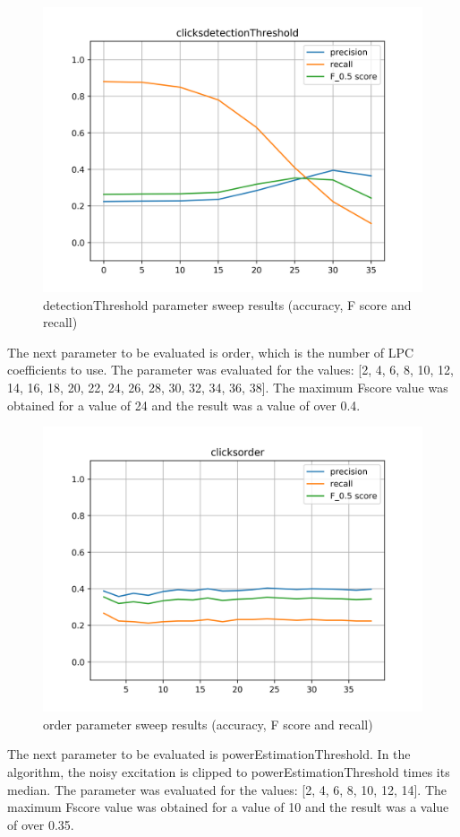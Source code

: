 \begin{figure}[H]
	\includegraphics[clip,width=0.7\columnwidth]{Figures/clicksdetectionThreshold.png}%
	\caption{detectionThreshold parameter sweep results (accuracy, F score and recall)}
	\label{fig:clicksdetectionThreshold}
\end{figure}

The next parameter to be evaluated is order, which is the number of LPC coefficients to use. The parameter was evaluated for the values: [2, 4, 6, 8, 10, 12, 14, 16, 18, 20, 22, 24, 26, 28, 30, 32, 34, 36, 38]. The maximum Fscore value was obtained for a value of 24 and the result was a value of over 0.4.

\begin{figure}[H]
	\includegraphics[clip,width=0.7\columnwidth]{Figures/clicksorder.png}%
	\caption{order parameter sweep results (accuracy, F score and recall)}
	\label{fig:clicksorder}
\end{figure}

The next parameter to be evaluated is powerEstimationThreshold. In the algorithm, the noisy excitation is clipped to powerEstimationThreshold times its median. The parameter was evaluated for the values: [2, 4, 6, 8, 10, 12, 14]. The maximum Fscore value was obtained for a value of 10 and the result was a value of over 0.35.

